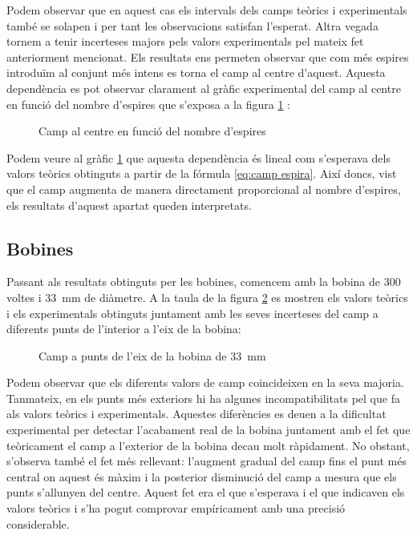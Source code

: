 Podem observar que en aquest cas els intervals dels camps teòrics i experimentals també se solapen i per tant les observacions satisfan l'esperat. Altra vegada tornem a tenir incerteses majors pels valors experimentals pel mateix fet anteriorment mencionat. Els resultats ens permeten observar que com més espires introduïm al conjunt més intens es torna el camp al centre d'aquest. Aquesta dependència es pot observar clarament al gràfic experimental del camp al centre en funció del nombre d'espires que s'exposa a la figura \cref{fig:camp vs n} :

\begin{figure}[htb]
  \centering
  \caption{Camp al centre en funció del nombre d'espires}
  \label{fig:camp vs n}
\end{figure}

Podem veure al gràfic \cref{fig:camp vs n} que aquesta dependència és lineal com s'esperava dels valors teòrics obtinguts a partir de la fórmula \cref{eq:camp espira}. Així doncs, vist que el camp augmenta de manera directament proporcional al nombre d'espires, els resultats d'aquest apartat queden interpretats.

\subsection{Bobines}\label{sec:bobines}
Passant als resultats obtinguts per les bobines, comencem amb la bobina de 300 voltes i \SI{33}{mm} de diàmetre. A la taula de la figura \cref{fig:bobina 33 mm} es mostren els valors teòrics i els experimentals obtinguts juntament amb les seves incerteses del camp a diferents punts de l'interior a l'eix de la bobina:

\begin{figure}[htb]
  \centering
  \caption{Camp a punts de l'eix de la bobina de \SI{33}{mm}}
  \label{fig:bobina 33 mm}
\end{figure}

Podem observar que els diferents valors de camp coincideixen en la seva majoria. Tanmateix, en els punts més exteriors hi ha algunes incompatibilitats pel que fa als valors teòrics i experimentals. Aquestes diferències es deuen a la dificultat experimental per detectar l'acabament real de la bobina juntament amb el fet que teòricament el camp a l'exterior de la bobina decau molt ràpidament. No obstant, s'observa també el fet més rellevant: l'augment gradual del camp fins el punt més central on aquest és màxim i la posterior disminució del camp a mesura que els punts s'allunyen del centre. Aquest fet era el que s'esperava i el que indicaven els valors teòrics i s'ha pogut comprovar empíricament amb una precisió considerable.

